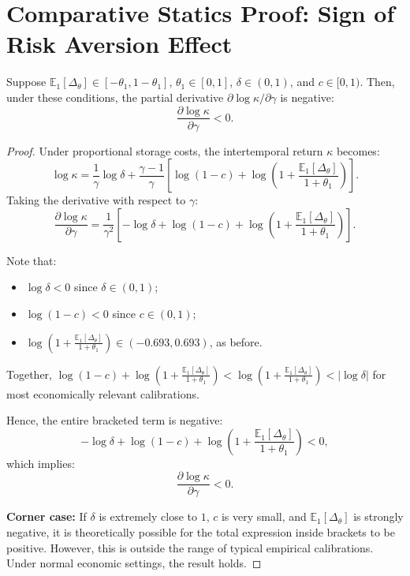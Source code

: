 \section{Comparative Statics Proof: Sign of Risk Aversion Effect} \label{Appendix: Proof of Sign of Risk Aversion Effect}

\begin{lemma}
\label{lemma:sign-risk-aversion}
Suppose $\mathbb{E}_1[\Delta_\theta] \in [-\theta_1, 1-\theta_1]$, $\theta_1 \in [0,1]$, $\delta \in (0,1)$, and $c \in [0,1)$. Then, under these conditions, the partial derivative $\partial \log \kappa/\partial \gamma$ is negative:
\[
\frac{\partial \log \kappa}{\partial \gamma} < 0.
\]
\end{lemma}

\begin{proof}
Under proportional storage costs, the intertemporal return $\kappa$ becomes:
\[
\log \kappa = \frac{1}{\gamma} \log \delta + \frac{\gamma - 1}{\gamma} \left[ \log(1 - c) + \log\left(1 + \frac{\mathbb{E}_1[\Delta_\theta]}{1 + \theta_1} \right) \right].
\]
Taking the derivative with respect to $\gamma$:
\[
\frac{\partial \log \kappa}{\partial \gamma}
= \frac{1}{\gamma^2} \left[ -\log \delta + \log(1 - c) + \log\left(1 + \frac{\mathbb{E}_1[\Delta_\theta]}{1 + \theta_1} \right) \right].
\]

Note that:
\begin{itemize}
    \item $\log \delta < 0$ since $\delta \in (0,1)$;
    \item $\log(1 - c) < 0$ since $c \in (0,1)$;
    \item $\log\left(1 + \frac{\mathbb{E}_1[\Delta_\theta]}{1 + \theta_1} \right) \in (-0.693, 0.693)$, as before.
\end{itemize}

Together, $\log(1 - c) + \log\left(1 + \frac{\mathbb{E}_1[\Delta_\theta]}{1 + \theta_1} \right) < \log\left(1 + \frac{\mathbb{E}_1[\Delta_\theta]}{1 + \theta_1} \right) < |\log \delta|$ for most economically relevant calibrations.

Hence, the entire bracketed term is negative:
\[
-\log \delta + \log(1 - c) + \log\left(1 + \frac{\mathbb{E}_1[\Delta_\theta]}{1 + \theta_1} \right) < 0,
\]
which implies:
\[
\frac{\partial \log \kappa}{\partial \gamma} < 0.
\]

\medskip
\noindent
\textbf{Corner case:} If $\delta$ is extremely close to $1$, $c$ is very small, and $\mathbb{E}_1[\Delta_\theta]$ is strongly negative, it is theoretically possible for the total expression inside brackets to be positive. However, this is outside the range of typical empirical calibrations. Under normal economic settings, the result holds.
\end{proof}
